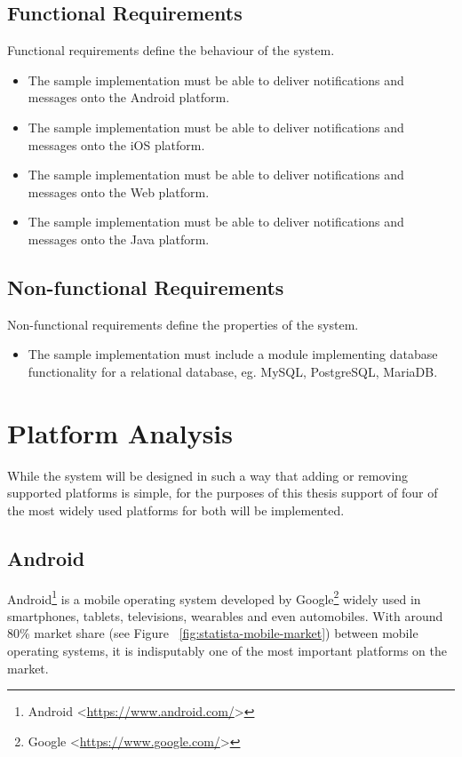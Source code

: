 \subsection{Functional Requirements}\label{sec:s-impl-func-req}
Functional requirements define the behaviour of the system.
\begin{itemize}
\item The sample implementation must be able to deliver notifications and messages onto the Android platform.
\item The sample implementation must be able to deliver notifications and messages onto the iOS platform.
\item The sample implementation must be able to deliver notifications and messages onto the Web platform.
\item The sample implementation must be able to deliver notifications and messages onto the Java platform.
\end{itemize}

\subsection{Non-functional Requirements}
Non-functional requirements define the properties of the system.
\begin{itemize}
\item The sample implementation must include a module implementing database functionality for a relational database, eg. MySQL, PostgreSQL, MariaDB.
\end{itemize}

\section{Platform Analysis}

While the system will be designed in such a way that adding or removing supported platforms is simple, for the purposes of this thesis support of four of the most widely used platforms for both will be implemented.

\subsection{Android}
Android\footnote{Android <\url{https://www.android.com/}>} is a mobile operating system developed by Google\footnote{Google <\url{https://www.google.com/}>} widely used in smartphones, tablets, televisions, wearables and even automobiles. With around 80\% market share (see Figure ~\ref{fig:statista-mobile-market}) between mobile operating systems, it is indisputably one of the most important platforms on the market.

